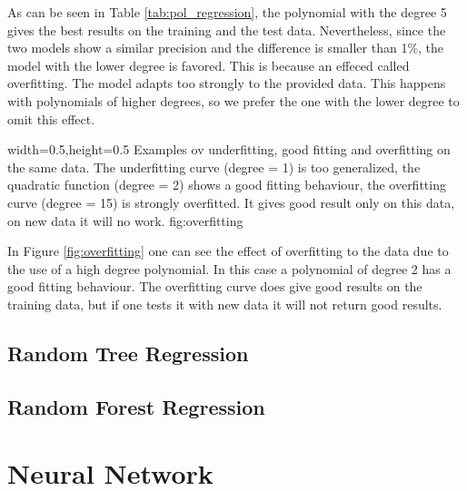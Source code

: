 As can be seen in Table \ref{tab:pol_regression}, the polynomial with the degree 5 gives the best results on the training and the test data. Nevertheless, since the two models show a similar precision and the difference is smaller than 1\%, the model with the lower degree is favored. This is because an effeced called overfitting. The model adapts too strongly to the provided data. This happens with polynomials of higher degrees, so we prefer the one with the lower degree to omit this effect.  


  {width=0.5\textwidth,height=0.5\textheight}%
  {Examples ov underfitting, good fitting and overfitting on the same data. The underfitting curve (degree = 1) is too generalized, the quadratic function (degree = 2) shows a good fitting behaviour, the overfitting curve (degree = 15) is strongly overfitted. It gives good result only on this data, on new data it will no work. }%
  {}%
  {fig:overfitting}%
  
In Figure \ref{fig:overfitting} one can see the effect of overfitting to the data due to the use of a high degree polynomial. In this case a polynomial of degree 2 has a good fitting behaviour. The overfitting curve does give good results on the training data, but if one tests it with new data it will not return good results. 
  
\subsection{Random Tree Regression}

\subsection{Random Forest Regression}

\section{Neural Network}

